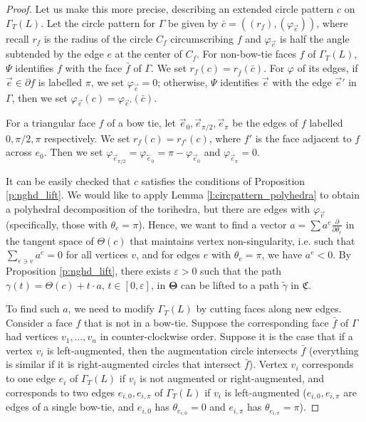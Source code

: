 \documentclass[11pt]{amsart}
\newcommand{\prpref}[1]{Proposition \ref{#1}}
\newcommand{\lemref}[1]{Lemma \ref{#1}}
\newcommand{\CCC}{{\underline{\mathfrak{C}}}}
\newcommand{\TTT}{{\underline{\mathbf{\Theta}}}}
\newcommand{\cev}[1]{\overset{\leftarrow}{#1}}
\newcommand{\del}{\partial}
\newcommand{\ddd}[1]{{\frac{\del}{\del #1}}}
\newcommand{\vphi}{\varphi}
\newcommand{\veps}{\varepsilon}
\theoremstyle{plain}
\theoremstyle{definition}
\begin{document}
\begin{proof}
Let us make this more precise,
describing an extended circle pattern $c$
on $\Gamma_T(L)$.
Let the circle pattern for $\Gamma$ be given by
$\bar{c} = ((r_f),(\vphi_{\vec{e}}))$,
where recall $r_f$ is the radius of the circle $C_f$
circumscribing $f$ and $\vphi_{\vec{e}}$
is half the angle subtended by the edge $e$
at the center of $C_f$.
For non-bow-tie faces $f$ of $\Gamma_T(L)$,
$\Psi$ identifies $f$ with the face $\bar{f}$ of $\Gamma$.
We set $r_f(c) = r_{\bar{f}}(\bar{c})$.
For $\vphi$ of its edges,
if $\vec{e} \in \del f$ is labelled $\pi$,
we set $\vphi_{\vec{e}} = 0$;
otherwise, $\Psi$ identifies $\vec{e}$
with the edge $\vec{e}'$ in $\Gamma$,
then we set $\vphi_{\vec{e}}(c) = \vphi_{\vec{e}'}(\bar{c})$.


For a triangular face $f$ of a bow tie,
let $\vec{e}_0, \vec{e}_{\pi/2}, \vec{e}_{\pi}$
be the edges of $f$ labelled $0,\pi/2, \pi$ respectively.
We set $r_f(c) = r_{f'}(c)$,
where $f'$ is the face adjacent to $f$ across $e_0$.
Then we set
$\vphi_{\vec{e}_{\pi/2}} = \vphi_{\cev{e}_0} = \pi - \vphi_{\vec{e}_0}$
and $\vphi_{\vec{e}_{\pi}} = 0$.


It can be easily checked that $c$ satisfies the conditions of
\prpref{p:nghd_lift}.
We would like to apply \lemref{l:circpattern_polyhedra}
to obtain a polyhedral decomposition of the torihedra,
but there are edges with $\vphi_{\vec{e}}$
(specifically, those with $\theta_e = \pi$).
Hence, we want to find a vector $a = \sum a^e \ddd{\theta_e}$
in the tangent space of $\Theta(c)$
that maintains vertex non-singularity,
i.e.  such that $\sum_{e \ni v} a^e = 0$ for all vertices $v$,
and for edges $e$ with $\theta_e = \pi$,
we have $a^e < 0$.
By \prpref{p:nghd_lift}, there exists $\veps > 0$
such that the path $\gamma(t) = \Theta(c) + t \cdot a$, $t\in [0,\veps]$,
in $\TTT$ can be lifted to a path $\tilde{\gamma}$ in $\CCC$.


To find such $a$, we need to modify $\Gamma_T(L)$ by
cutting faces along new edges.
Consider a face $f$ that is not in a bow-tie.
Suppose the corresponding face $\bar{f}$ of $\Gamma$
had vertices $v_1,\ldots,v_n$ in counter-clockwise order.
Suppose it is the case that if a vertex $v_i$ is left-augmented,
then the augmentation circle intersects $\bar{f}$
(everything is similar if it is right-augmented circles that intersect
$\bar{f}$).
Vertex $v_i$ corresponds to one edge $e_i$ of $\Gamma_T(L)$
if $v_i$ is not augmented or right-augmented,
and corresponds to two edges $e_{i,0}, e_{i,\pi}$
of $\Gamma_T(L)$ if $v_i$ is left-augmented
($e_{i,0}, e_{i,\pi}$ are edges of a single bow-tie,
and $e_{i,0}$ has $\theta_{e_{i,0}} = 0$
and $e_{i,\pi}$ has $\theta_{e_{i,\pi}} = \pi$).



\end{proof}
\end{document}
